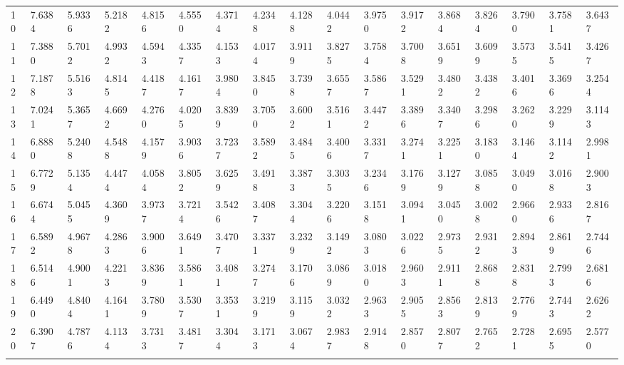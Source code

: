 {\begin{tabular}{|m{8pt}|m{18pt}*{15}{m{18pt}}}
 10 & 7.6384 & 5.9336 & 5.2182 & 4.8156 & 4.5550 & 4.3714 & 4.2348 & 4.1288 & 4.0442 & 3.9750 & 3.9172 & 3.8684 & 3.8264 & 3.7900 & 3.7581 & 3.6437 \\[2pt] \arrayrulecolor{light-gray}\hline\arrayrulecolor{black}  
 11 & 7.3880 & 5.7012 & 4.9932 & 4.5943 & 4.3357 & 4.1533 & 4.0174 & 3.9119 & 3.8275 & 3.7584 & 3.7008 & 3.6519 & 3.6099 & 3.5735 & 3.5415 & 3.4267 \\[2pt] \arrayrulecolor{light-gray}\hline\arrayrulecolor{black}  
 12 & 7.1878 & 5.5163 & 4.8145 & 4.4187 & 4.1617 & 3.9804 & 3.8450 & 3.7398 & 3.6557 & 3.5867 & 3.5291 & 3.4802 & 3.4382 & 3.4016 & 3.3696 & 3.2544 \\[2pt] \arrayrulecolor{light-gray}\hline\arrayrulecolor{black}  
 13 & 7.0241 & 5.3657 & 4.6692 & 4.2760 & 4.0205 & 3.8399 & 3.7050 & 3.6002 & 3.5161 & 3.4472 & 3.3896 & 3.3407 & 3.2986 & 3.2620 & 3.2299 & 3.1143 \\[2pt] \arrayrulecolor{light-gray}\hline\arrayrulecolor{black}  
 14 & 6.8880 & 5.2408 & 4.5488 & 4.1579 & 3.9036 & 3.7237 & 3.5892 & 3.4845 & 3.4006 & 3.3317 & 3.2741 & 3.2251 & 3.1830 & 3.1464 & 3.1142 & 2.9981 \\[2pt] \arrayrulecolor{light-gray}\hline\arrayrulecolor{black}  
 15 & 6.7729 & 5.1354 & 4.4474 & 4.0584 & 3.8052 & 3.6259 & 3.4918 & 3.3873 & 3.3035 & 3.2346 & 3.1769 & 3.1279 & 3.0858 & 3.0490 & 3.0168 & 2.9003 \\[2pt] \arrayrulecolor{light-gray}\hline\arrayrulecolor{black}  
 16 & 6.6744 & 5.0455 & 4.3609 & 3.9737 & 3.7214 & 3.5426 & 3.4087 & 3.3044 & 3.2206 & 3.1518 & 3.0941 & 3.0450 & 3.0028 & 2.9660 & 2.9336 & 2.8167 \\[2pt] \arrayrulecolor{light-gray}\hline\arrayrulecolor{black}  
 17 & 6.5892 & 4.9678 & 4.2863 & 3.9006 & 3.6491 & 3.4707 & 3.3371 & 3.2329 & 3.1492 & 3.0803 & 3.0226 & 2.9735 & 2.9312 & 2.8943 & 2.8619 & 2.7446 \\[2pt] \arrayrulecolor{light-gray}\hline\arrayrulecolor{black}  
 18 & 6.5146 & 4.9001 & 4.2213 & 3.8369 & 3.5861 & 3.4081 & 3.2747 & 3.1706 & 3.0869 & 3.0180 & 2.9603 & 2.9111 & 2.8688 & 2.8318 & 2.7993 & 2.6816 \\[2pt] \arrayrulecolor{light-gray}\hline\arrayrulecolor{black}  
 19 & 6.4490 & 4.8404 & 4.1641 & 3.7809 & 3.5307 & 3.3531 & 3.2199 & 3.1159 & 3.0322 & 2.9633 & 2.9055 & 2.8563 & 2.8139 & 2.7769 & 2.7443 & 2.6262 \\[2pt] \arrayrulecolor{light-gray}\hline\arrayrulecolor{black}  
 20 & 6.3907 & 4.7876 & 4.1134 & 3.7313 & 3.4817 & 3.3044 & 3.1713 & 3.0674 & 2.9837 & 2.9148 & 2.8570 & 2.8077 & 2.7652 & 2.7281 & 2.6955 & 2.5770 \\[2pt] \arrayrulecolor{light-gray}\hline\arrayrulecolor{black}  

\end{tabular}}
